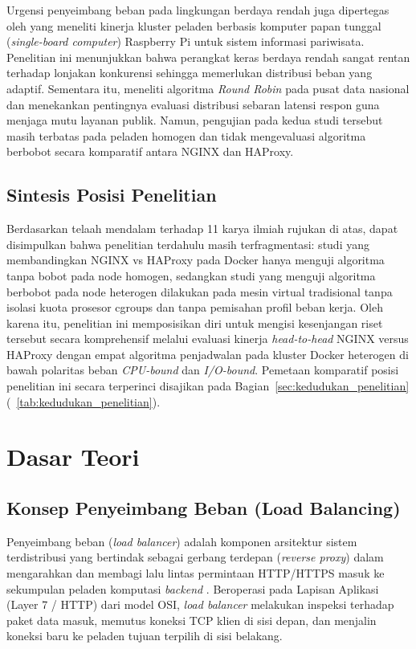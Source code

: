 Urgensi penyeimbang beban pada lingkungan berdaya rendah juga dipertegas oleh \citet{ramadhani2026analysis} yang meneliti kinerja kluster peladen berbasis komputer papan tunggal (\textit{single-board computer}) Raspberry Pi untuk sistem informasi pariwisata. Penelitian ini menunjukkan bahwa perangkat keras berdaya rendah sangat rentan terhadap lonjakan konkurensi sehingga memerlukan distribusi beban yang adaptif. Sementara itu, \citet{sudiatmika2023round} meneliti algoritma \textit{Round Robin} pada pusat data nasional dan menekankan pentingnya evaluasi distribusi sebaran latensi respon guna menjaga mutu layanan publik. Namun, pengujian pada kedua studi tersebut masih terbatas pada peladen homogen dan tidak mengevaluasi algoritma berbobot secara komparatif antara NGINX dan HAProxy.

\subsection{Sintesis Posisi Penelitian}
Berdasarkan telaah mendalam terhadap 11 karya ilmiah rujukan di atas, dapat disimpulkan bahwa penelitian terdahulu masih terfragmentasi: studi yang membandingkan NGINX vs HAProxy pada Docker hanya menguji algoritma tanpa bobot pada node homogen, sedangkan studi yang menguji algoritma berbobot pada node heterogen dilakukan pada mesin virtual tradisional tanpa isolasi kuota prosesor cgroups dan tanpa pemisahan profil beban kerja. Oleh karena itu, penelitian ini memposisikan diri untuk mengisi kesenjangan riset tersebut secara komprehensif melalui evaluasi kinerja \textit{head-to-head} NGINX versus HAProxy dengan empat algoritma penjadwalan pada kluster Docker heterogen di bawah polaritas beban \textit{CPU-bound} dan \textit{I/O-bound}. Pemetaan komparatif posisi penelitian ini secara terperinci disajikan pada Bagian~\ref{sec:kedudukan_penelitian} (\tablename~\ref{tab:kedudukan_penelitian}).

\section{Dasar Teori}

\subsection{Konsep Penyeimbang Beban (Load Balancing)}
Penyeimbang beban (\textit{load balancer}) adalah komponen arsitektur sistem terdistribusi yang bertindak sebagai gerbang terdepan (\textit{reverse proxy}) dalam mengarahkan dan membagi lalu lintas permintaan HTTP/HTTPS masuk ke sekumpulan peladen komputasi \textit{backend} \citep{buke2026load, sakib2025dynamic, zahir2025analisis}. Beroperasi pada Lapisan Aplikasi (Layer 7 / HTTP) dari model OSI, \textit{load balancer} melakukan inspeksi terhadap paket data masuk, memutus koneksi TCP klien di sisi depan, dan menjalin koneksi baru ke peladen tujuan terpilih di sisi belakang.

